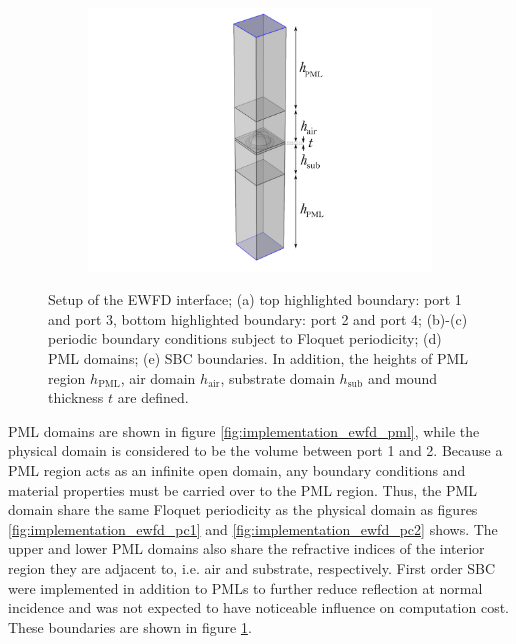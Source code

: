 \begin{figure}[htb]
\begin{subfigure}{0.19\textwidth}
        \centering
        \includegraphics[width=1\linewidth, trim=55cm 0 45cm 0cm, clip]{figures/ch4/implem/ewfd/ewfd_sbc_h5.png}
        \caption{}
        \label{fig:implementation_ewfd_sbc}
    \end{subfigure}
    \caption{Setup of the EWFD interface; (a) top highlighted boundary: port 1 and port 3, bottom highlighted boundary: port 2 and port 4; (b)-(c) periodic boundary conditions subject to Floquet periodicity; (d) PML domains; (e) SBC boundaries. In addition, the heights of PML region $h_\text{PML}$, air domain $h_\text{air}$, substrate domain $h_\text{sub}$ and mound thickness $t$ are defined.}
    \label{fig:implementation_ewfd_setup}
\end{figure}

PML domains are shown in figure \ref{fig:implementation_ewfd_pml}, while the physical domain is considered to be the volume between port 1 and 2. Because a PML region acts as an infinite open domain, any boundary conditions and material properties must be carried over to the PML region. Thus, the PML domain share the same Floquet periodicity as the physical domain as figures \ref{fig:implementation_ewfd_pc1} and \ref{fig:implementation_ewfd_pc2} shows. The upper and lower PML domains also share the refractive indices of the interior region they are adjacent to, i.e. air and substrate, respectively. First order SBC were implemented in addition to PMLs to further reduce reflection at normal incidence and was not expected to have noticeable influence on computation cost. These boundaries are shown in figure \ref{fig:implementation_ewfd_sbc}.

